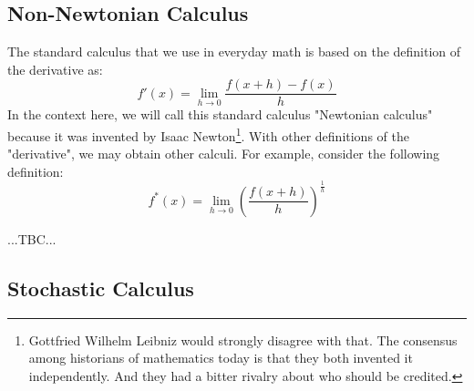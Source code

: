 \subsection{Non-Newtonian Calculus}
The standard calculus that we use in everyday math is based on the definition of the derivative as:
\begin{equation}
  f'(x) = \lim_{h \rightarrow 0} \frac{f(x + h) - f(x)}{h}
\end{equation}
In the context here, we will call this standard calculus "Newtonian calculus" because it was invented by Isaac Newton\footnote{Gottfried Wilhelm Leibniz would strongly disagree with that. The consensus among historians of mathematics today is that they both invented it independently. And they had a bitter rivalry about who should be credited.}. With other definitions of the "derivative", we may obtain other calculi. For example, consider the following definition:
\begin{equation}
  f^*(x) = \lim_{h \rightarrow 0} \left(  \frac{f(x + h)}{h}  \right)^{\frac{1}{h}} 
\end{equation}



...TBC...


% 




\subsection{Stochastic Calculus}




